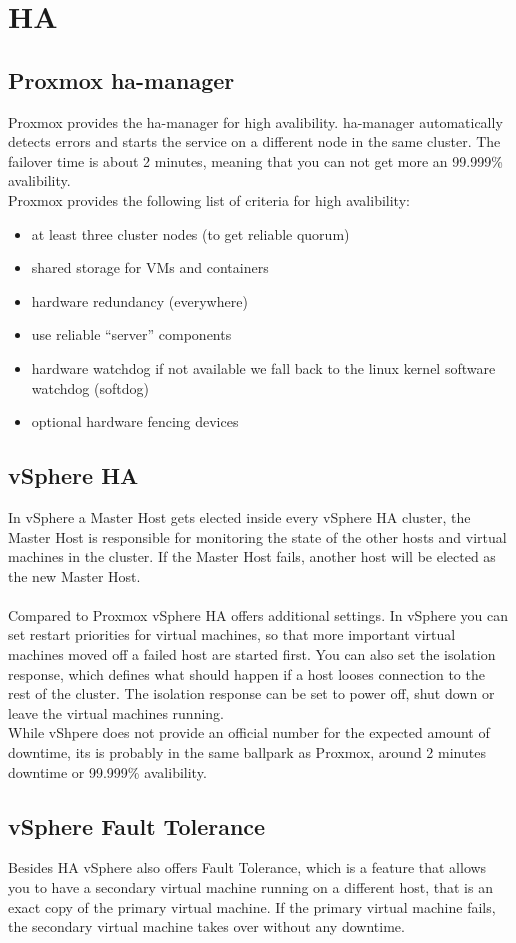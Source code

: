 \section{HA}

\subsection{Proxmox ha-manager}
Proxmox provides the ha-manager for high avalibility. ha-manager automatically detects errors and starts the service on a different node in the same cluster. The failover time is about 2 minutes, meaning that you can not get more an 99.999\% avalibility.
\\
Proxmox provides the following list of criteria for high avalibility:

\begin{itemize}
    \item at least three cluster nodes (to get reliable quorum)
    \item shared storage for VMs and containers
    \item hardware redundancy (everywhere)
    \item use reliable “server” components
    \item hardware watchdog \- if not available we fall back to the linux kernel software watchdog (softdog)
    \item optional hardware fencing devices
\end{itemize}

\subsection{vSphere HA}
In vSphere a Master Host gets elected inside every vSphere HA cluster, the Master Host is responsible for monitoring the state of the other hosts and virtual machines in the cluster. If the Master Host fails, another host will be elected as the new Master Host.
\\\\
Compared to Proxmox vSphere HA offers additional settings. In vSphere you can set restart priorities for virtual machines, so that more important virtual machines moved off a failed host are started first. You can also set the isolation response, which defines what should happen if a host looses connection to the rest of the cluster. The isolation response can be set to power off, shut down or leave the virtual machines running.
\\
While vShpere does not provide an official number for the expected amount of downtime, its is probably in the same ballpark as Proxmox, around 2 minutes downtime or 99.999\% avalibility.

\subsection{vSphere Fault Tolerance}

Besides HA vSphere also offers Fault Tolerance, which is a feature that allows you to have a secondary virtual machine running on a different host, that is an exact copy of the primary virtual machine. If the primary virtual machine fails, the secondary virtual machine takes over without any downtime. 